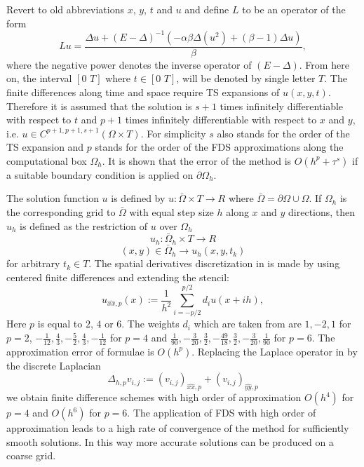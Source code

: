 \documentclass[11pt,a4paper,twoside]{article}
\begin{document}
Revert to old abbreviations $x$, $y$, $t$ and $u$ and define $L$ to be an operator of the form
\begin{equation}\label{operator}
Lu = \frac{\Delta u + (E-\Delta)^{-1} (-\alpha \beta \Delta( u^2) + (\beta -1)\Delta u)}{\beta},
\end{equation}
where the negative power denotes the inverse operator of $(E-\Delta)$. From here on, the interval $[0\,\, T]$ where $t \in [0\,\, T]$, will be denoted by single letter $T$. The finite differences along time and space require TS expansions of $u(x,y,t)$. Therefore it is assumed that the solution is $s+1$ times infinitely differentiable with respect to $t$ and $p+1$ times infinitely differentiable with respect to $x$ and $y$, i.e. $u \in C^{p+1,p+1,s+1}(\Omega \times T)$. For simplicity $s$ also stands for the order of the TS expansion and $p$ stands for the order of the FDS approximations along the computational box $\Omega_h$. It is shown that the error of the method is $O(h^p + \tau^s)$ if a suitable boundary condition is applied on $\partial \Omega_h$.

The solution function $u$ is defined by $u : \bar \Omega \times T \rightarrow  R$ where $\bar \Omega = \partial \Omega \cup \Omega$. If $\Omega_h$ is the corresponding grid to $\bar \Omega$ with equal step size $h$ along $x$ and $y$ directions, then $u_h$ is defined as the restriction of $u$ over $\Omega_h$
$$u_h : \bar \Omega_h \times T \rightarrow  R$$
$$ (x,y) \in \bar \Omega_h \rightarrow u_h(x,y, t_k)$$
for arbitrary $t_k \in T$. The spatial derivatives discretization in  is made by using centered finite differences and extending the stencil:
\begin{equation}\label{fd}
u_{\widehat{xx},p}(x) :=  \frac{1}{h^2} \sum\limits_{i=-p/2}^{p/2} d_i u(x+ih),
\end{equation}
 Here $p$ is equal to $2$, $4$ or $6$.  The weights $d_i$ which are taken from \cite{forn} are  
 $ 1,-2,1$ for $p=2$, $-\frac{1}{12}, \frac{4}{3}, -\frac{5}{2}, \frac{4}{3}, -\frac{1}{12}$ for $p=4$ and  $\frac{1}{90}, -\frac{3}{20}, \frac{3}{2}, -\frac{49}{18}, \frac{3}{2}, -\frac{3}{20}, \frac{1}{90}$ for $p=6$. The approximation error of  formulae  is $O(h^p)$. Replacing the Laplace operator in  by the discrete Laplacian 
$$ \Delta_{h,p} v_{i,j} := (v_{i,j})_{\widehat{xx},p} + (v_{i,j})_{\widehat{yy},p}$$ 
we obtain finite difference schemes with high order of approximation $O(h^4)$ for $p=4$ and  $O(h^6)$ for $p=6 $.  The application of FDS with high order of approximation leads to a high rate of convergence of the method for sufficiently smooth solutions. In this way more accurate solutions can be produced on a coarse grid. 
\end{document}
